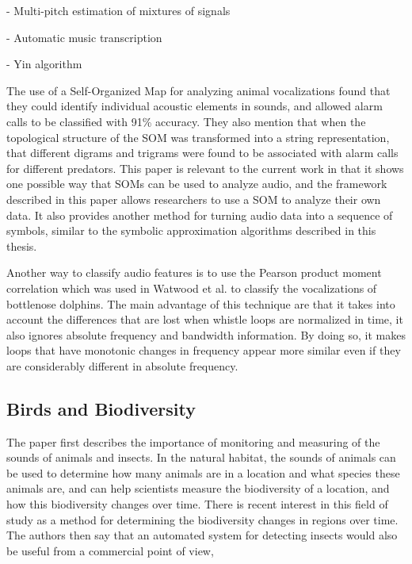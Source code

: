 - Multi-pitch estimation of mixtures of signals \cite{klapuri08}
\cite{fujihara12}

- Automatic music transcription \cite{benetos12}

- Yin algorithm

The use of a Self-Organized Map for analyzing animal vocalizations
\cite{placer06} found that they could identify individual acoustic
elements in sounds, and allowed alarm calls to be classified with 91\%
accuracy.  They also mention that when the topological structure of
the SOM was transformed into a string representation, that different
digrams and trigrams were found to be associated with alarm calls for
different predators.  This paper is relevant to the current work in
that it shows one possible way that SOMs can be used to analyze audio,
and the framework described in this paper allows researchers to use a
SOM to analyze their own data.  It also provides another method for
turning audio data into a sequence of symbols, similar to the symbolic
approximation algorithms described in this thesis.

Another way to classify audio features is to use the Pearson product
moment correlation which was used in Watwood et al. \cite{watwood04}
to classify the vocalizations of bottlenose dolphins.  The main
advantage of this technique are that it takes into account the
differences that are lost when whistle loops are normalized in time,
it also ignores absolute frequency and bandwidth information.  By
doing so, it makes loops that have monotonic changes in frequency
appear more similar even if they are considerably different in
absolute frequency.



\subsection{Birds and Biodiversity}


The paper first describes the importance of monitoring and measuring
of the sounds of animals and insects.  In the natural habitat, the
sounds of animals can be used to determine how many animals are in a
location and what species these animals are, and can help scientists
measure the biodiversity of a location, and how this biodiversity
changes over time.  There is recent interest in this field of study
\cite{wimmer2010} \cite{seuer2008} as a method for determining the
biodiversity changes in regions over time.  The authors then say that
an automated system for detecting insects would also be useful from a
commercial point of view,

